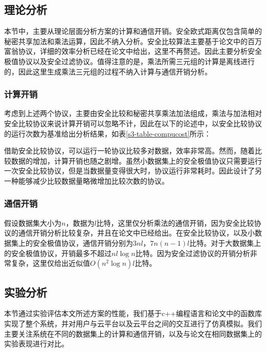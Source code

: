 \subsection{理论分析}
本节中，主要从理论层面分析方案的计算和通信开销。安全欧式距离仅包含简单的秘密共享加法和乘法运算，因此不纳入分析。安全比较算法主要基于论文\cite{rathee2020cryptflow2}中的百万富翁协议，详细的效率分析已经在论文中给出，这里不再赘述。因此主要分析安全极值协议以及安全过滤协议。值得注意的是，乘法所需三元组的计算是离线进行的，因此这里生成乘法三元组的过程不纳入计算与通信开销分析。
\subsubsection{计算开销}
考虑到上述两个协议，主要由安全比较和秘密共享乘法加法组成，乘法与加法相对安全比较协议来说计算开销可以忽略不计，因此在以下的论述中，以安全比较协议的运行次数为基准给出分析结果，如表\ref{s3-table-compucost}所示：
\begin{table}[htbp]
	\centering
	\renewcommand{\arraystretch}{1.3}
	\caption{计算开销理论分析}
	\label{s3-table-compucost}
\end{table}

借助安全比较协议，可以运行一轮协议比较多对数据，效率非常高。然而，随着比较数据的增加，计算开销也随之剧增。虽然小数据集上的安全极值协议只需要运行一次安全比较协议，但是当数据量变得很大时，协议运行非常耗时。因此设计了另一种能够减少比较数据量略微增加比较次数的协议。

\subsubsection{通信开销}
假设数据集大小为$ n $，数据为$ l$比特，这里仅分析乘法的通信开销，因为安全比较协议的通信开销分析比较复杂，并且在论文\cite{rathee2020cryptflow2}中已经给出。在安全比较协议，以及小数据集上的安全极值协议，通信开销分别为$ 3nl $，$ 7n(n-1)l $比特。对于大数据集上的安全极值协议，开销最多不超过$ nl\log n $比特。因为安全过滤协议的开销分析非常复杂，这里仅给出近似值$ O(n^2\log n)l $比特。
\subsection{实验分析}
本节通过实验评估本文所述方案的性能，我们基于c++编程语言和论文\cite{rathee2020cryptflow2}中的函数库实现了整个系统，并对用户与云平台以及云平台之间的交互进行了仿真模拟。我们主要关注系统在不同的数据集上的计算和通信开销，以及与论文\cite{wu2020secure,mohassel2019practical,jaschke2019unsupervised}在相同数据集上的实验表现进行对比。

